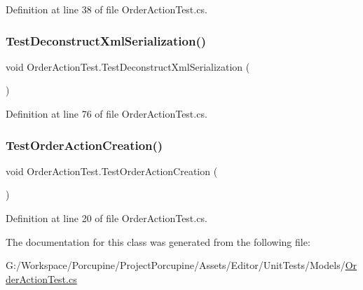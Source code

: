 Definition at line 38 of file Order\+Action\+Test.\+cs.

\mbox{\label{class_order_action_test_ad9a158cdf42e0a3c2c0371fa822a62be}} 
\subsubsection{\texorpdfstring{Test\+Deconstruct\+Xml\+Serialization()}{TestDeconstructXmlSerialization()}}
{\footnotesize\ttfamily void Order\+Action\+Test.\+Test\+Deconstruct\+Xml\+Serialization (\begin{DoxyParamCaption}{ }\end{DoxyParamCaption})}



Definition at line 76 of file Order\+Action\+Test.\+cs.

\mbox{\label{class_order_action_test_a138f880c2c0966a9c1b975986bc059d1}} 
\subsubsection{\texorpdfstring{Test\+Order\+Action\+Creation()}{TestOrderActionCreation()}}
{\footnotesize\ttfamily void Order\+Action\+Test.\+Test\+Order\+Action\+Creation (\begin{DoxyParamCaption}{ }\end{DoxyParamCaption})}



Definition at line 20 of file Order\+Action\+Test.\+cs.



The documentation for this class was generated from the following file\+:\begin{DoxyCompactItemize}
\item 
G\+:/\+Workspace/\+Porcupine/\+Project\+Porcupine/\+Assets/\+Editor/\+Unit\+Tests/\+Models/\hyperlink{_order_action_test_8cs}{Order\+Action\+Test.\+cs}\end{DoxyCompactItemize}
